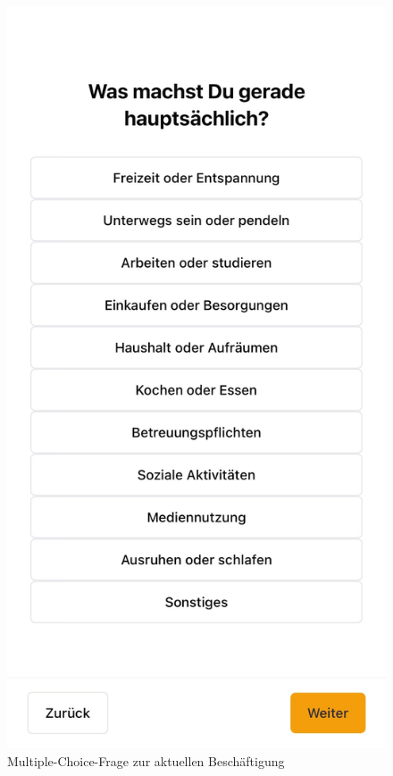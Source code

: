 \begin{figure}[h]
    \centering
    \begin{minipage}[t]{0.38\textwidth}
        \centering
        \includegraphics[width=\textwidth]{Arbeit/Bilder/printscreens/beschaeftigung.jpeg}
        \caption{Multiple-Choice-Frage zur aktuellen Beschäftigung}

\end{minipage}
\end{figure}
